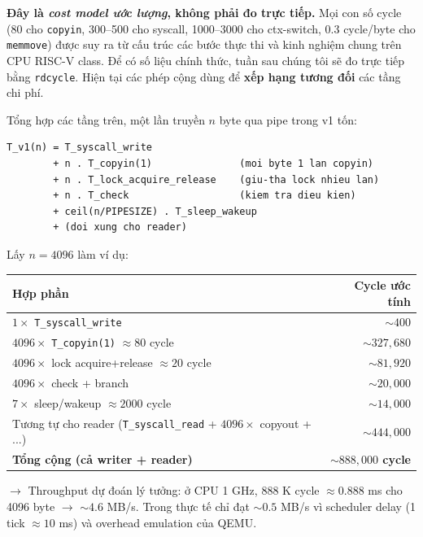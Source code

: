 \documentclass[11pt,a4paper]{article}
\begin{document}
\begin{warnbox}
\textbf{Đây là \emph{cost model ước lượng}, không phải đo trực tiếp.} Mọi con số cycle (80 cho \texttt{copyin}, 300--500 cho syscall, 1000--3000 cho ctx-switch, 0.3 cycle/byte cho \texttt{memmove}) được suy ra từ cấu trúc các bước thực thi và kinh nghiệm chung trên CPU RISC-V class. Để có số liệu chính thức, tuần sau chúng tôi sẽ đo trực tiếp bằng \texttt{rdcycle}. Hiện tại các phép cộng dùng để \textbf{xếp hạng tương đối} các tầng chi phí.
\end{warnbox}

Tổng hợp các tầng trên, một lần truyền $n$ byte qua pipe trong v1 tốn:

\begin{lstlisting}[style=plain]
T_v1(n) = T_syscall_write
        + n . T_copyin(1)               (moi byte 1 lan copyin)
        + n . T_lock_acquire_release    (giu-tha lock nhieu lan)
        + n . T_check                   (kiem tra dieu kien)
        + ceil(n/PIPESIZE) . T_sleep_wakeup
        + (doi xung cho reader)
\end{lstlisting}

Lấy $n = 4096$ làm ví dụ:

\begin{center}
\begin{tabularx}{0.95\linewidth}{Xr}
\toprule
\textbf{Hợp phần} & \textbf{Cycle ước tính} \\
\midrule
$1\times$ \texttt{T\_syscall\_write} & $\sim 400$ \\
$4096\times$ \texttt{T\_copyin(1)} $\approx 80$ cycle & $\sim 327{,}680$ \\
$4096\times$ lock acquire+release $\approx 20$ cycle & $\sim 81{,}920$ \\
$4096\times$ check + branch & $\sim 20{,}000$ \\
$7\times$ sleep/wakeup $\approx 2000$ cycle & $\sim 14{,}000$ \\
Tương tự cho reader (\texttt{T\_syscall\_read} + $4096\times$ copyout + ...) & $\sim 444{,}000$ \\
\midrule
\textbf{Tổng cộng (cả writer + reader)} & \textbf{$\sim 888{,}000$ cycle} \\
\bottomrule
\end{tabularx}
\end{center}

$\rightarrow$ Throughput dự đoán lý tưởng: ở CPU 1 GHz, 888 K cycle $\approx 0.888$ ms cho 4096 byte $\rightarrow$ $\sim 4.6$ MB/s. Trong thực tế chỉ đạt $\sim 0.5$ MB/s vì scheduler delay (1 tick $\approx 10$ ms) và overhead emulation của QEMU.
\end{document}
